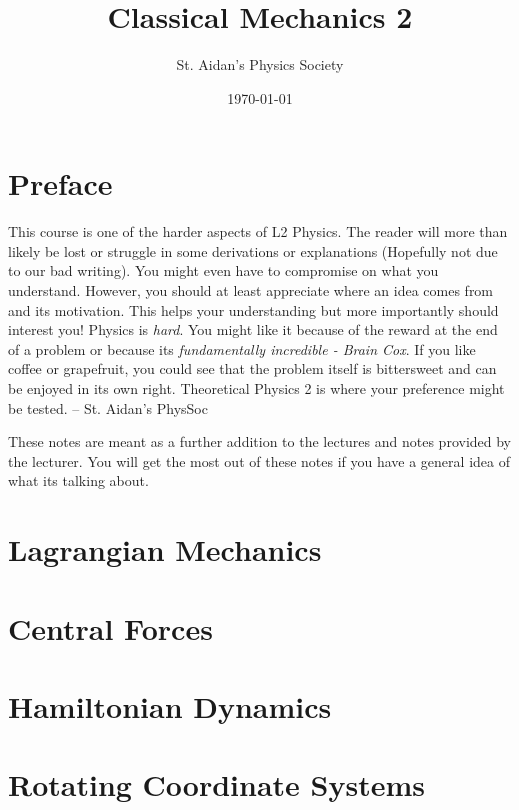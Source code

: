 \documentclass[10pt,%
               a4paper]{physics_notes}
\begin{document}
\title{Classical Mechanics 2}
\author{St. Aidan's Physics Society}
\date{\today}
\maketitle

\tableofcontents
\newpage

\section{Preface}
This course is one of the harder aspects of L2 Physics. The reader will more than likely be lost or struggle in some derivations or explanations (Hopefully not due to our bad writing). You might even have to compromise on what you understand. However, you should at least appreciate where an idea comes from and its motivation. This helps your understanding but more importantly should interest you! Physics is \textit{hard}. You might like it because of the reward at the end of a problem or because its \textit{fundamentally incredible - Brain Cox}. If you like coffee or grapefruit, you could see that the problem itself is bittersweet and can be enjoyed in its own right.  Theoretical Physics 2 is where your preference might be tested. -- St. Aidan's PhysSoc\par



These notes are meant as a further addition to the lectures and notes provided by the lecturer. You will get the most out of these notes if you have a general idea of what its talking about.
\newpage

\section{Lagrangian Mechanics}



\section{Central Forces}


\section{Hamiltonian Dynamics}


\section{Rotating Coordinate Systems}


 
\end{document}
